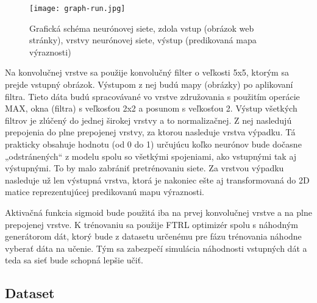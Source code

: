 \begin{figure}[H]
	\begin{center}\texttt{[image: graph-run.jpg]}
		\caption[Návrh neurónovej siete]{
			Grafická schéma neurónovej siete, zdola vstup (obrázok web stránky), vrstvy neurónovej siete, výstup (predikovaná mapa výraznosti)
		}\label{tensorboard}
	\end{center}
\end{figure}

Na konvolučnej vrstve sa použije konvolučný filter o veľkosti 5x5, ktorým sa prejde vstupný obrázok. Výstupom z nej budú mapy (obrázky) po aplikovaní filtra. Tieto dáta budú spracovávané vo vrstve združovania s použitím operácie MAX, okna (filtra) s veľkosťou 2x2 a posunom s veľkosťou 2. Výstup všetkých filtrov je zlúčený do jednej širokej vrstvy a to normalizačnej. Z nej nasledujú prepojenia do plne prepojenej vrstvy, za ktorou nasleduje vrstva výpadku\cite{dropout}. Tá prakticky obsahuje hodnotu (od 0 do 1) určujúcu koľko neurónov bude dočasne „odstránených“ z modelu spolu so všetkými spojeniami, ako vstupnými tak aj výstupnými. To by malo zabrániť pretrénovaniu siete. Za vrstvou výpadku nasleduje už len výstupná vrstva, ktorá je nakoniec ešte aj transformovaná do 2D matice reprezentujúcej predikovanú mapu výraznosti. 

Aktivačná funkcia sigmoid bude použitá iba na prvej konvolučnej vrstve a na plne prepojenej vrstve. K trénovaniu sa použije FTRL optimizér spolu s náhodným generátorom dát, ktorý bude z datasetu určenému pre fázu trénovania náhodne vyberať dáta na učenie. Tým sa zabezpečí simulácia náhodnosti vstupných dát a teda sa sieť bude schopná lepšie učiť. 


\subsection{Dataset}
\label{dataset}
	

\iffalse
\begin{equation}
content...
\end{equation}
\fi